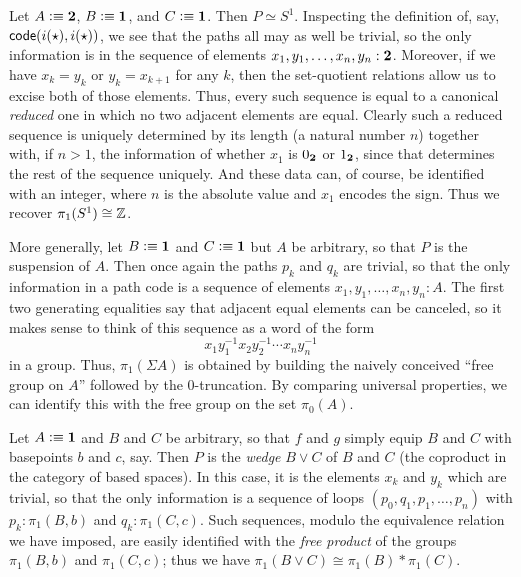 \begin{eg}\label{eg:circle}
  Let $A\vcentcolon\equiv \mathbf{2}$, $B\vcentcolon\equiv\mathbf{1}$, and $C\vcentcolon\equiv \mathbf{1}$.
  Then $P \simeq S^1$.
  Inspecting the definition of, say, $\mathsf{code}(i(\star),i(\star))$, we see that the paths all may as well be trivial, so the only information is in the sequence of elements $x_1,y_1,\dots,x_n,y_n: \mathbf{2}$.
  Moreover, if we have $x_k=y_k$ or $y_k=x_{k+1}$ for any $k$, then the set-quotient relations allow us to excise both of those elements.
  Thus, every such sequence is equal to a canonical \emph{reduced} one in which no two adjacent elements are equal.
  Clearly such a reduced sequence is uniquely determined by its length (a natural number $n$) together with, if $n>1$, the information of whether $x_1$ is $0_{\mathbf{2}}$ or $1_{\mathbf{2}}$, since that determines the rest of the sequence uniquely.
  And these data can, of course, be identified with an integer, where $n$ is the absolute value and $x_1$ encodes the sign.
  Thus we recover $\pi_1(S^1)\cong \mathbb{Z}$.
\end{eg}

\begin{eg}\label{eg:suspension}
  More generally, let $B\vcentcolon\equiv\mathbf{1}$ and $C\vcentcolon\equiv \mathbf{1}$ but $A$ be arbitrary, so that $P$ is the suspension of $A$.
  Then once again the paths $p_k$ and $q_k$ are trivial, so that the only information in a path code is a sequence of elements $x_1,y_1,\dots,x_n,y_n: A$.
  The first two generating equalities say that adjacent equal elements can be canceled, so it makes sense to think of this sequence as a word of the form
  \[ x_1 y_1^{-1} x_2 y_2^{-1} \cdots x_n y_n^{-1} \]
  in a group.
  Thus, $\pi_1(\Sigma A)$ is obtained by building the naively conceived ``free group on $A$'' followed by the 0-truncation.
  By comparing universal properties, we can identify this with the free group on the set $\pi_0(A)$.
\end{eg}

\begin{eg}\label{eg:wedge}
  Let $A\vcentcolon\equiv\mathbf{1}$ and $B$ and $C$ be arbitrary, so that $f$ and $g$ simply equip $B$ and $C$ with basepoints $b$ and $c$, say.
  Then $P$ is the \emph{wedge} $B\vee C$ of $B$ and $C$ (the coproduct in the category of based spaces).
  In this case, it is the elements $x_k$ and $y_k$ which are trivial, so that the only information is a sequence of loops $(p_0,q_1,p_1,\dots,p_n)$ with $p_k:\pi_1(B,b)$ and $q_k:\pi_1(C,c)$.
  Such sequences, modulo the equivalence relation we have imposed, are easily identified with the \emph{free product} of the groups $\pi_1(B,b)$ and $\pi_1(C,c)$; thus we have $\pi_1(B\vee C) \cong \pi_1(B) * \pi_1(C)$.
\end{eg}

